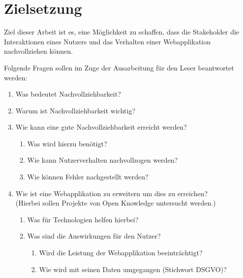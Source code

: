 \section{Zielsetzung}


Ziel dieser Arbeit ist es, eine Möglichkeit zu schaffen, dass die Stakeholder die Interaktionen eines Nutzers und das Verhalten einer Webapplikation nachvollziehen können. 

Folgende Fragen sollen im Zuge der Ausarbeitung für den Leser beantwortet werden:


\begin{enumerate}
	\item Was bedeutet Nachvollziehbarkeit?
	\item Warum ist Nachvollziehbarkeit wichtig?
	\item Wie kann eine gute Nachvollziehbarkeit erreicht werden?
	\begin{enumerate}
		\item Was wird hierzu benötigt?
		\item Wie kann Nutzerverhalten nachvollzogen werden?
		\item Wie können Fehler nachgestellt werden?
	\end{enumerate}
	\item Wie ist eine Webapplikation zu erweitern um dies zu erreichen? \\ (Hierbei sollen Projekte von Open Knowledge untersucht werden.)
	\begin{enumerate}
		\item Was für Technologien helfen hierbei?
		\item Was sind die Auswirkungen für den Nutzer?
		\begin{enumerate}
			\item Wird die Leistung der Webapplikation beeinträchtigt?
			\item Wie wird mit seinen Daten umgegangen (Stichwort DSGVO)?
		\end{enumerate}
	\end{enumerate}
\end{enumerate}


